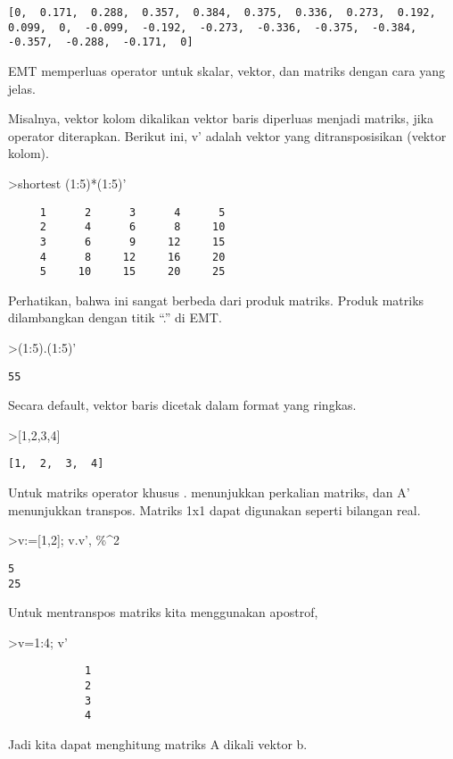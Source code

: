 \documentclass[
]{book}
\begin{document}
\begin{verbatim}
[0,  0.171,  0.288,  0.357,  0.384,  0.375,  0.336,  0.273,  0.192,
0.099,  0,  -0.099,  -0.192,  -0.273,  -0.336,  -0.375,  -0.384,
-0.357,  -0.288,  -0.171,  0]
\end{verbatim}

EMT memperluas operator untuk skalar, vektor, dan matriks dengan cara yang jelas.

Misalnya, vektor kolom dikalikan vektor baris diperluas menjadi matriks, jika operator diterapkan. Berikut ini, v' adalah vektor yang ditransposisikan (vektor kolom).

\textgreater shortest (1:5)*(1:5)'

\begin{verbatim}
     1      2      3      4      5 
     2      4      6      8     10 
     3      6      9     12     15 
     4      8     12     16     20 
     5     10     15     20     25 
\end{verbatim}

Perhatikan, bahwa ini sangat berbeda dari produk matriks. Produk matriks dilambangkan dengan titik ``.'' di EMT.

\textgreater(1:5).(1:5)'

\begin{verbatim}
55
\end{verbatim}

Secara default, vektor baris dicetak dalam format yang ringkas.

\textgreater{[}1,2,3,4{]}

\begin{verbatim}
[1,  2,  3,  4]
\end{verbatim}

Untuk matriks operator khusus . menunjukkan perkalian matriks, dan A' menunjukkan transpos. Matriks 1x1 dapat digunakan seperti bilangan real.

\textgreater v:={[}1,2{]}; v.v', \%\^{}2

\begin{verbatim}
5
25
\end{verbatim}

Untuk mentranspos matriks kita menggunakan apostrof,

\textgreater v=1:4; v'

\begin{verbatim}
            1 
            2 
            3 
            4 
\end{verbatim}

Jadi kita dapat menghitung matriks A dikali vektor b.
\end{document}
